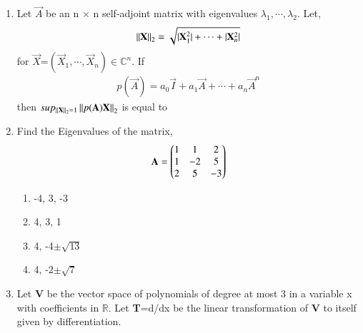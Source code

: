 \renewcommand{\theequation}{\theenumi}
\renewcommand{\thefigure}{\theenumi}
\begin{enumerate}[label=\thesection.\arabic*.,ref=\thesection.\theenumi]

\item Let $\vec{A}$ be an n $\times$ n self-adjoint matrix with eigenvalues $\lambda_1, \cdots, \lambda_2$.
Let,\begin{align} \left\lVert\mathbf{X}\right\rVert_2=\sqrt{\vert\mathbf{X}_{1}^{2}\vert+\cdots+\vert\mathbf{X}_{n}^{2}\vert}\end{align} for $\vec{X}$=$(\vec{X}_{1},\cdots,\vec{X}_{n})\in \mathbb{C}^n$. If \begin{align}
p(\vec{A})=a_0\vec{I}+a_1\vec{A}+\cdots+a_n\vec{A}^n
\end{align}
then $sup_{\left\lVert\mathbf{X}\right\rVert_{2}=1}\left\lVert p(\mathbf{A})\mathbf{X}\right\rVert_2$ is equal to
%
\\
\solution

%
\item Find the Eigenvalues of the matrix,
\begin{align}
\mathbf{A} = \begin{pmatrix}1 & 1 & 2 \\ 1 & -2 & 5 \\ 2 & 5 & -3 \end{pmatrix}\label{eq:solutions/2017/june/32/eq:1}
\end{align}
\begin{enumerate}
\item -4, 3, -3
\item 4, 3, 1
\item 4, -4$\pm\sqrt{13}$
\item 4, -2$\pm\sqrt{7}$
\end{enumerate}
%
%
\solution


\item Let \textbf{V} be the vector space of polynomials of degree at most 3 in a variable x with coefficients in $\mathbb{R}$. Let \textbf{T}=d/dx be the linear transformation of \textbf{V} to itself given by differentiation.\\


\end{enumerate}
